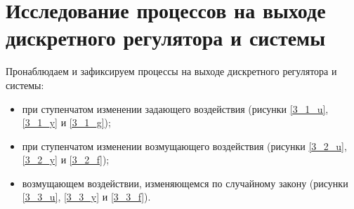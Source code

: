\chapter{Исследование процессов на выходе дискретного регулятора и системы}
\label{ch:chap3}
Пронаблюдаем и зафиксируем процессы на выходе дискретного регулятора и системы:
\begin{itemize}
	\item при ступенчатом изменении задающего воздействия (рисунки \ref{3_1_u}, \ref{3_1_y} и \ref{3_1_g});
	\item при ступенчатом изменении возмущающего воздействия (рисунки \ref{3_2_u}, \ref{3_2_y} и \ref{3_2_f});
	\item возмущающем воздействии, изменяющемся по случайному закону (рисунки \ref{3_3_u}, \ref{3_3_y} и \ref{3_3_f}).
\end{itemize}

